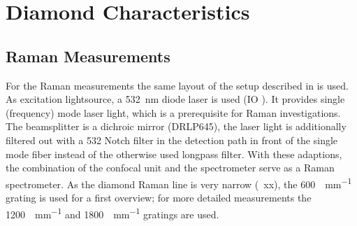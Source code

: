 
\section{Diamond Characteristics}

	\subsection{Raman Measurements} \label{subsec::raman}

	For the Raman measurements the same layout of the setup described in  is used.
	As excitation lightsource, a \SI{532}{nm} diode laser is used (IO ).
	It provides single (frequency) mode laser light, which is a prerequisite for Raman investigations.
	The beamsplitter is a dichroic mirror (DRLP645), the laser light is additionally filtered out with a 532 Notch filter in the detection path in front of the single mode fiber instead of the otherwise used longpass filter.
	With these adaptions, the combination of the confocal unit and the spectrometer serve as a Raman spectrometer.
	As the diamond Raman line is very narrow (~xx), the \SI[per-mode=symbol]{600}{\lines\per\mm} grating is used for a first overview; for more detailed measurements the \SI[per-mode=symbol]{1200}{\lines\per\mm} and \SI[per-mode=symbol]{1800}{\lines\per\mm} gratings are used.
